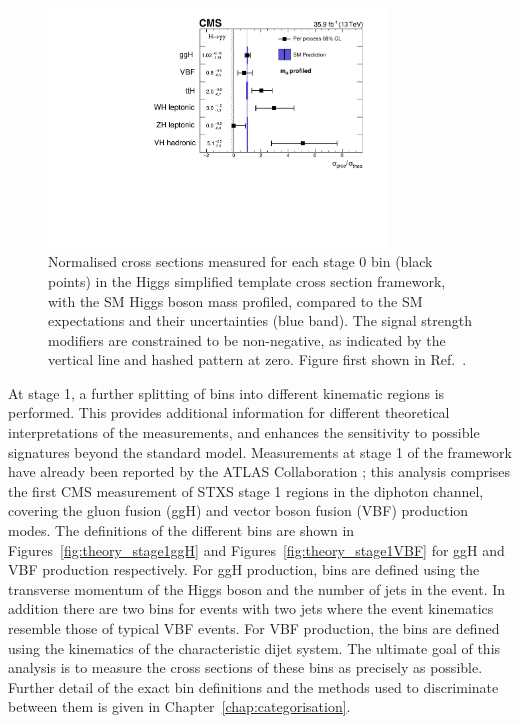\begin{figure}[hptb]
  \centering
  \includegraphics[width=0.8\textwidth]{Figures/Theory/PerProcSTXS.pdf}
  \caption[Stage 0 simplified template cross section measurements from Ref.~\cite{HIG-16-040}.]
  {
    Normalised cross sections measured for each stage 0 bin (black points) 
    in the Higgs simplified template cross section framework, 
    with the SM Higgs boson mass profiled, 
    compared to the SM expectations and their uncertainties (blue band). 
    The signal strength modifiers are constrained to be non-negative, 
    as indicated by the vertical line and hashed pattern at zero.
    Figure first shown in Ref.~\cite{HIG-16-040}.
  }
  \label{fig:theory_PerProcSTXS}
\end{figure}

At stage 1, a further splitting of bins into different kinematic regions is performed.
This provides additional information for different theoretical interpretations of the measurements, 
and enhances the sensitivity to possible signatures beyond the standard model.
Measurements at stage 1 of the framework have already been reported by the ATLAS Collaboration \cite{ATLAS_Hgg36,ATLAS_Hgg80,ATLASstage0_ZZ}; 
this analysis comprises the first CMS measurement of STXS stage 1 regions in the diphoton channel, 
covering the gluon fusion (ggH) and vector boson fusion (VBF) production modes.
The definitions of the different bins are shown in 
Figures~\ref{fig:theory_stage1ggH} and Figures~\ref{fig:theory_stage1VBF} 
for ggH and VBF production respectively.
For ggH production, bins are defined using the transverse momentum of the Higgs boson
and the number of jets in the event. 
In addition there are two bins for events with two jets where the event kinematics
resemble those of typical VBF events.
For VBF production, the bins are defined using the kinematics 
of the characteristic dijet system.
The ultimate goal of this analysis is to measure the cross sections of these bins 
as precisely as possible.
Further detail of the exact bin definitions 
and the methods used to discriminate between them is given in Chapter~\ref{chap:categorisation}.

